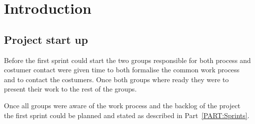 
\chapter{Introduction}








\section{Project start up}
Before the first sprint could start the two groups responsible for both process and costumer contact were given time to both formalise the common work process and to contact the costumers.
Once both groups where ready they were to present their work to the rest of the groups.

Once all groups were aware of the work process and the backlog of the project the first sprint could be planned and stated as described in Part~\ref{PART:Sprints}.
